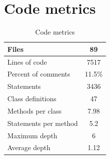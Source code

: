 \chapter{Code metrics}
\vfill
\begin{table}[!h]
	\centering
	\label{t:codeMetrics}
	\begin{tabular}{|l|c|}
		\hline Files &  89 \\ 
		\hline Lines of code & 7517 \\
		\hline Percent of comments & 11.5\% \\ 
		\hline Statements & 3436 \\ 
		\hline Class definitions & 47 \\ 
		\hline Methods per class & 7.98 \\ 
		\hline Statements per method & 5.2 \\ 
		\hline Maximum depth & 6 \\
		\hline Average depth & 1.12 \\
		\hline 
	\end{tabular} 
	\caption{Code metrics}
\end{table}
\vfill

